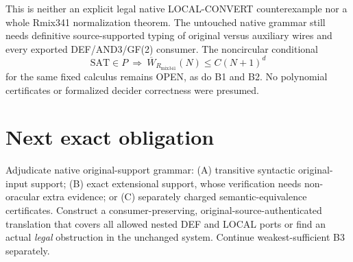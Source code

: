 \documentclass[11pt]{article}
\begin{document}
This is neither an explicit legal native LOCAL-CONVERT counterexample nor a whole Rmix341 normalization theorem. The untouched native grammar still needs definitive source-supported typing of original versus auxiliary wires and every exported DEF/AND3/GF(2) consumer. The noncircular conditional
\[
 \mathrm{SAT}\in P\ \Longrightarrow\ 
 \overline W_{R_{\mathrm{mix341}}}(N)\le C(N+1)^d
\]
for the same fixed calculus remains OPEN, as do B1 and B2. No polynomial certificates or formalized decider correctness were presumed.

\section*{Next exact obligation}
Adjudicate native original-support grammar: (A) transitive syntactic original-input support; (B) exact extensional support, whose verification needs non-oracular extra evidence; or (C) separately charged semantic-equivalence certificates. Construct a consumer-preserving, original-source-authenticated translation that covers all allowed nested DEF and LOCAL ports or find an actual \emph{legal} obstruction in the unchanged system. Continue weakest-sufficient B3 separately.



\end{document}
